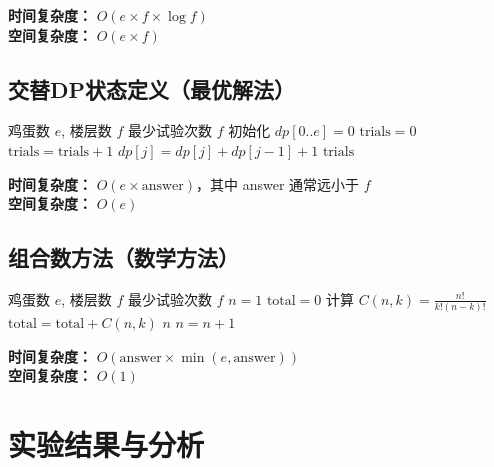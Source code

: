 \documentclass[12pt,a4paper]{article}
\begin{document}
\textbf{时间复杂度：} $O(e \times f \times \log f)$ \\
\textbf{空间复杂度：} $O(e \times f)$

\subsection{交替DP状态定义（最优解法）}

\begin{algorithm}[H]
\caption{交替DP（最优解法）}
\begin{algorithmic}[1]
\REQUIRE 鸡蛋数 $e$, 楼层数 $f$
\ENSURE 最少试验次数
\ENDIF
{}
    \RETURN $f$
\ENDIF
\STATE 初始化 $dp[0..e] = 0$ 
\STATE $\text{trials} = 0$
    \STATE $\text{trials} = \text{trials} + 1$
        \STATE $dp[j] = dp[j] + dp[j-1] + 1$
    \ENDFOR
\ENDWHILE
\RETURN $\text{trials}$
\end{algorithmic}
\end{algorithm}

\textbf{时间复杂度：} $O(e \times \text{answer})$，其中 answer 通常远小于 $f$ \\
\textbf{空间复杂度：} $O(e)$

\subsection{组合数方法（数学方法）}

\begin{algorithm}[H]
\caption{组合数方法}
\begin{algorithmic}[1]
\REQUIRE 鸡蛋数 $e$, 楼层数 $f$
\ENSURE 最少试验次数
\ENDIF
{}
    \RETURN $f$
\ENDIF
\STATE $n = 1$
    \STATE $\text{total} = 0$
        \STATE 计算 $C(n, k) = \frac{n!}{k!(n-k)!}$
        \STATE $\text{total} = \text{total} + C(n, k)$
            \RETURN $n$
        \ENDIF
    \ENDFOR
    \STATE $n = n + 1$
\ENDWHILE
\end{algorithmic}
\end{algorithm}

\textbf{时间复杂度：} $O(\text{answer} \times \min(e, \text{answer}))$ \\
\textbf{空间复杂度：} $O(1)$

\section{实验结果与分析}
\end{document}
